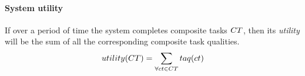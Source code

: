 \paragraph{System utility}
\label{section:utility}
\newcommand{\functionSystemUtility}[2]{\functionSignature{utility}{\setCompositeTask{}{}}}

If over a period of time the system completes composite tasks $\setCompositeTask{}{}$, then its \textit{utility} will be the sum of all the corresponding composite task qualities.
	\begin{equation}
		\label{eq:system_utility}
		\functionSystemUtility{}{} = 
		\sum\limits_{\forall \varCompositeTask{}{} \in \setCompositeTask{}{}}
		\functionCompositeTaskQuality{}{}
	\end{equation}